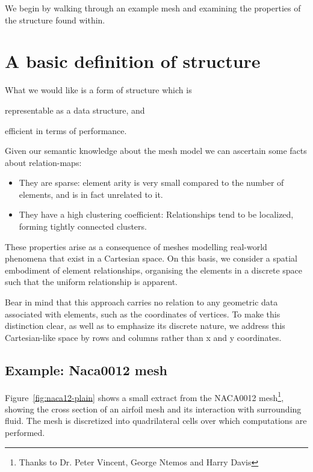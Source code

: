 \label{chap:diving-into-problem}
We begin by walking through an example mesh and examining the properties of the structure found within.

\section{A basic definition of structure}
What we would like is a form of structure which is
\begin{enumerate*}[label=\alph*)]
\item representable as a data structure, and \item efficient in terms of performance.
\end{enumerate*}

Given our semantic knowledge about the mesh model we can ascertain some facts about relation-maps:
\begin{itemize}
\item They are sparse: element arity is very small compared to the number of elements, and is in fact unrelated to it.
\item They have a high clustering coefficient: Relationships tend to be localized, forming tightly connected clusters.
\end{itemize}

These properties arise as a consequence of meshes modelling real-world phenomena that exist in a Cartesian space.
On this basis, we consider a spatial embodiment of element relationships, organising the elements in a discrete space such that the uniform relationship is apparent.

Bear in mind that this approach carries no relation to any geometric data associated with elements, such as the coordinates of vertices. To make this distinction clear, as well as to emphasize its discrete nature, we address this Cartesian-like space by rows and columns rather than x and y coordinates.

\subsection{Example: Naca0012 mesh}
Figure~\ref{fig:naca12-plain} shows a small extract from the NACA0012 mesh\footnote{Thanks to Dr. Peter Vincent, George Ntemos and Harry Davis}, showing the cross section of an airfoil mesh and its interaction with surrounding fluid. The mesh is discretized into quadrilateral cells over which computations are performed.

